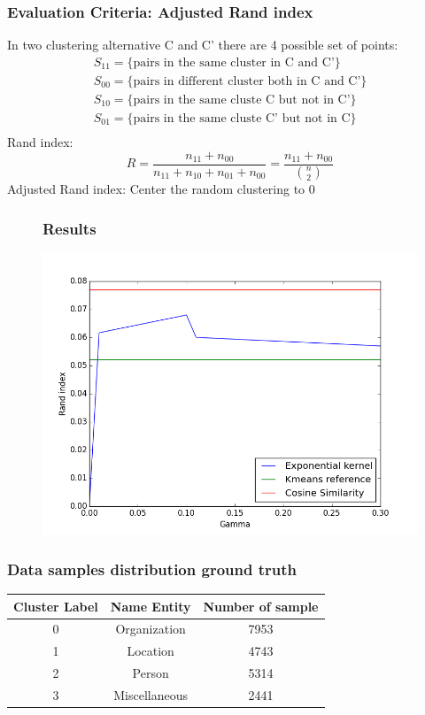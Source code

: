 \documentclass{beamer}
\begin{document}
\begin{frame}
\frametitle{Evaluation Criteria: Adjusted Rand index}
In two clustering alternative C and C' there are 4 possible set of points:
$$
\begin{array}{ll}
S_{11} = \{\text{pairs in the same cluster in C and C'} \}\\
S_{00} =  \{\text{pairs in different cluster both in C and C'} \}\\
S_{10} =  \{\text{pairs in the same cluste C but not in C'} \}\\
S_{01} =  \{\text{pairs in the same cluste C' but not in C}  \}\\
\end{array}
$$
Rand index:
$$
R=\frac{n_{11}+n_{00}}{n_{11}+n_{10}+n_{01}+n_{00}} = \frac{n_{11}+n_{00}}{{ n\choose 2}}
$$
Adjusted Rand index: Center the random clustering to 0
\end{frame}


\begin{frame}
\begin{figure}
\frametitle{Results}
\includegraphics[width=0.8\linewidth]{../REPORT/Figures_Mik/results.png}  
\end{figure}
\end{frame}

\begin{frame}
\frametitle{Data samples distribution ground truth}
\begin{center}
\begin{tabular}{ |c|c|c|} 
\hline
Cluster Label & Name Entity & Number of sample\\
\hline
0 & Organization & 7953\\
 \hline
1 & Location & 4743\\
 \hline
2 & Person & 5314\\
 \hline
3 & Miscellaneous & 2441\\
 \hline
\end{tabular}
\end{center}
\end{frame}
\end{document}

